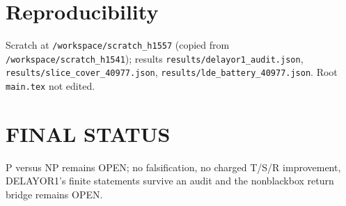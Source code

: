 \documentclass[11pt]{article}
\begin{document}
\section*{Reproducibility}
Scratch at \texttt{/workspace/scratch\_h1557} (copied from \texttt{/workspace/scratch\_h1541});
results \texttt{results/delayor1\_audit.json}, \texttt{results/slice\_cover\_40977.json},
\texttt{results/lde\_battery\_40977.json}. Root \texttt{main.tex} not edited.

\section*{FINAL STATUS}
P versus NP remains OPEN; no falsification, no charged T/S/R improvement, DELAYOR1's finite statements survive
an audit and the nonblackbox return bridge remains OPEN.
\end{document}
